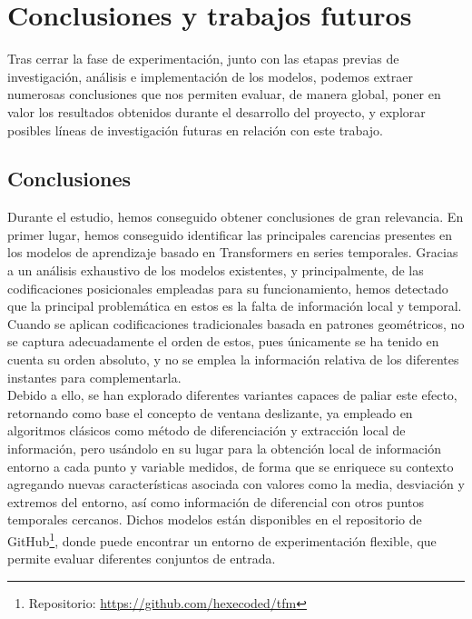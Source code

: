 \chapter{Conclusiones y trabajos futuros}

Tras cerrar la fase de experimentación, junto con las etapas previas de investigación, análisis e implementación de los modelos, podemos extraer numerosas conclusiones que nos permiten evaluar, de manera global, poner en valor los resultados obtenidos durante el desarrollo del proyecto, y explorar posibles líneas de investigación futuras en relación con este trabajo.\\

\section{Conclusiones}

Durante el estudio, hemos conseguido obtener conclusiones de gran relevancia. En primer lugar, hemos conseguido identificar las principales carencias presentes en los modelos de aprendizaje basado en Transformers en series temporales. Gracias a un análisis exhaustivo de los modelos existentes, y principalmente, de las codificaciones posicionales empleadas para su funcionamiento, hemos detectado que la principal problemática en estos es la falta de información local y temporal. Cuando se aplican codificaciones tradicionales basada en patrones geométricos, no se captura adecuadamente el orden de estos, pues únicamente se ha tenido en cuenta su orden absoluto, y no se emplea la información relativa de los diferentes instantes para complementarla.\\

Debido a ello, se han explorado diferentes variantes capaces de paliar este efecto, retornando como base el concepto de ventana deslizante, ya empleado en algoritmos clásicos como método de diferenciación y extracción local de información, pero usándolo en su lugar para la obtención local de información entorno a cada punto y variable medidos, de forma que se enriquece su contexto agregando nuevas características asociada con valores como la media, desviación y extremos del entorno, así como información de diferencial con otros puntos temporales cercanos. Dichos modelos están disponibles en el repositorio de GitHub\footnote{Repositorio: \url{https://github.com/hexecoded/tfm}}, donde puede encontrar un entorno de experimentación flexible, que permite evaluar diferentes conjuntos de entrada.\\

